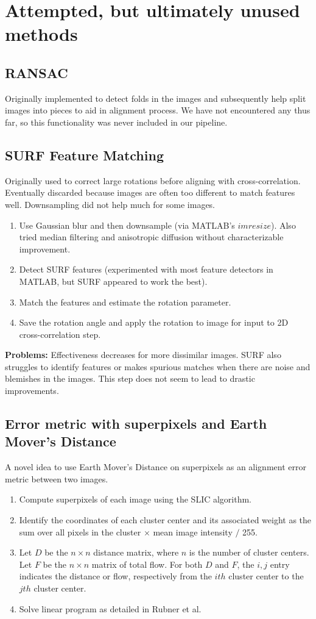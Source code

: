 \documentclass{article}
\begin{document}
\pagebreak

\section{Attempted, but ultimately unused methods}
\subsection{RANSAC}
Originally implemented to detect folds in the images and subsequently help split images into pieces to aid in alignment process. We have not encountered any thus far, so this functionality was never included in our pipeline.
\subsection{SURF Feature Matching}
Originally used to correct large rotations before aligning with cross-correlation. Eventually discarded because images are often too different to match features well. Downsampling did not help much for some images.\\
\begin{enumerate}
\item Use Gaussian blur and then downsample (via MATLAB's $imresize$). Also tried median filtering and anisotropic diffusion without characterizable improvement.
\item Detect SURF features (experimented with most feature detectors in MATLAB, but SURF appeared to work the best). 
\item Match the features and estimate the rotation parameter.
\item Save the rotation angle and apply the rotation to image for input to 2D cross-correlation step.
\end{enumerate}
\textbf{Problems:} Effectiveness decreases for more dissimilar images. SURF also struggles to identify features or makes spurious matches when there are noise and blemishes in the images. This step does not seem to lead to drastic improvements. \\
\subsection{Error metric with superpixels and Earth Mover's Distance}
A novel idea to use Earth Mover's Distance on superpixels as an alignment error metric between two images.
\begin{enumerate}
\item Compute superpixels of each image using the SLIC algorithm.
\item Identify the coordinates of each cluster center and its associated weight as the sum over all pixels in the cluster $\times$ mean image intensity $/$ 255. 
\item Let $D$ be the $n \times n$ distance matrix, where $n$ is the number of cluster centers. Let $F$ be the $n \times n$ matrix of total flow. For both $D$ and $F$, the $i,j$ entry indicates the distance or flow, respectively from the $ith$ cluster center to the $jth$ cluster center. 
\item Solve linear program as detailed in Rubner et al. \cite{rubner00}
\end{enumerate}
\end{document}
